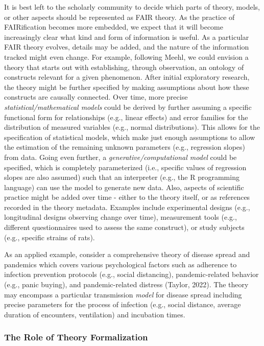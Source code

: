 \documentclass[
  man, noextraspace,floatsintext]{apa6}
\begin{document}
It is best left to the scholarly community to decide which parts of theory, models, or other aspects should be represented as FAIR theory.
As the practice of FAIRification becomes more embedded,
we expect that it will become increasingly clear what kind and form of information is useful.
As a particular FAIR theory evolves, details may be added, and the nature of the information tracked might even change.
For example, following Meehl, we could envision a theory that starts out with establishing, through observation, an ontology of constructs relevant for a given phenomenon.
After initial exploratory research, the theory might be further specified by making assumptions about how these constructs are causally connected.
Over time, more precise \emph{statistical/mathematical models} could be derived by further assuming a specific functional form for relationships (e.g., linear effects) and error families for the distribution of measured variables (e.g., normal distributions).
This allows for the specification of statistical models, which make just enough assumptions to allow the estimation of the remaining unknown parameters (e.g., regression slopes) from data.
Going even further, a \emph{generative/computational model} could be specified,
which is completely parameterized (i.e., specific values of regression slopes are also assumed) such that an interpreter (e.g., the R programming language) can use the model to generate new data.
Also, aspects of scientific practice might be added over time - either to the theory itself, or as references recorded in the theory metadata.
Examples include experimental designs (e.g., longitudinal designs observing change over time), measurement tools (e.g., different questionnaires used to assess the same construct), or study subjects (e.g., specific strains of rats).

As an applied example, consider a comprehensive theory of disease spread and pandemics which covers various psychological factors
such as adherence to infection prevention protocols (e.g., social distancing),
pandemic-related behavior (e.g., panic buying),
and pandemic-related distress
(Taylor, 2022).
The theory may encompass a particular transmission \emph{model} for disease spread including precise parameters for the process of infection (e.g., social distance, average duration of encounters, ventilation) and incubation times.

\subsubsection{The Role of Theory Formalization}\label{the-role-of-theory-formalization}
\end{document}
